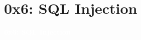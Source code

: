 \documentclass[aspectratio=169]{beamer}
\begin{document}
\section{0x6: SQL Injection}
{
\begin{frame}
\huge{\textcolor{white}{\textbf{0x6: SQL Injection}}}
\end{frame}
}
\end{document}
